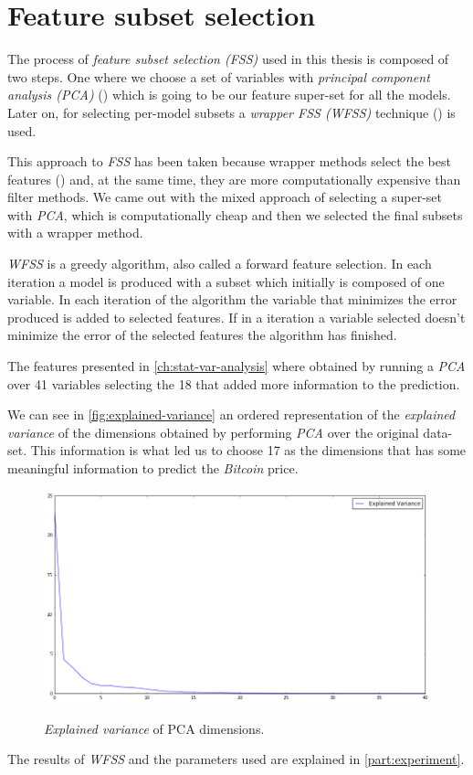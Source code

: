 
\chapter{Feature subset selection}
\label{ch:feature-selection}

The process of \textit{feature subset selection (FSS)} used in this
thesis is composed of two steps. One where we choose a set of
variables with \textit{principal component analysis (PCA)}
(\cite{pearson1901liii}) which is going to be our feature super-set
for all the models. Later on, for selecting per-model subsets a
\textit{wrapper FSS (WFSS)} technique (\cite{kohavi1997wrappers}) is
used.

This approach to \textit{FSS} has been taken because wrapper methods
select the best features (\cite{inza2004filter, kumari2011filter})
and, at the same time, they are more computationally expensive than
filter methods. We came out with the mixed approach of selecting a
super-set with \textit{PCA}, which is computationally cheap and then
we selected the final subsets with a wrapper method.

\textit{WFSS} is a greedy algorithm, also called a forward feature
selection. In each iteration a model is produced with a subset which
initially is composed of one variable. In each iteration of the
algorithm the variable that minimizes the error produced is added to
selected features. If in a iteration a variable selected doesn't
minimize the error of the selected features the algorithm has
finished.

The features presented in \autoref{ch:stat-var-analysis} where
obtained by running a \textit{PCA} over 41 variables selecting the 18
that added more information to the prediction.

We can see in \autoref{fig:explained-variance} an ordered
representation of the \textit{explained variance} of the dimensions
obtained by performing \textit{PCA} over the original data-set. This
information is what led us to choose 17 as the dimensions that has
some meaningful information to predict the \textit{Bitcoin} price.

\begin{figure}[bth]
  \myfloatalign
  {\includegraphics[width=1\linewidth]
    {gfx/explained-variance}}
  \caption{\textit{Explained variance} of PCA dimensions.}
  \label{fig:explained-variance}
\end{figure}

The results of \textit{WFSS} and the parameters used are explained in
\autoref{part:experiment}.



